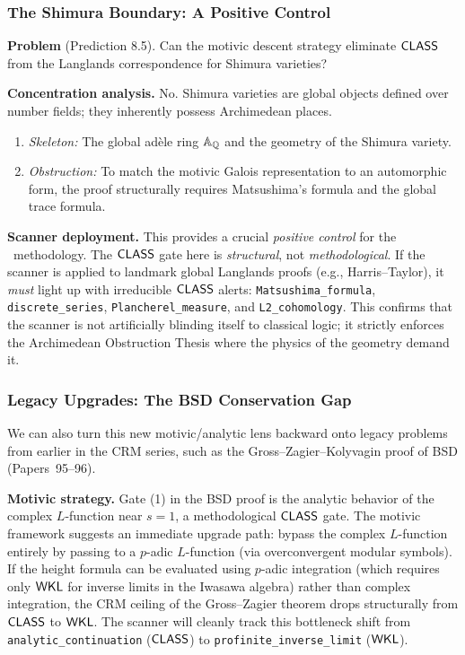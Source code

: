\subsubsection{The Shimura Boundary: A Positive Control}\label{sec:predict-shimura}

\noindent\textbf{Problem} (Prediction 8.5). Can the motivic descent strategy eliminate $\textsf{CLASS}$ from the Langlands correspondence for Shimura varieties?

\medskip
\noindent\textbf{Concentration analysis.} No. Shimura varieties are global objects defined over number fields; they inherently possess Archimedean places.

\begin{enumerate}[nosep,label=(\roman*)]
\item \emph{Skeleton:} The global ad\`ele ring $\mathbb{A}_{\mathbb{Q}}$ and the geometry of the Shimura variety.
\item \emph{Obstruction:} To match the motivic Galois representation to an automorphic form, the proof structurally requires Matsushima's formula and the global trace formula.
\end{enumerate}

\noindent\textbf{Scanner deployment.} This provides a crucial \emph{positive control} for the \CRMlint\ methodology. The $\textsf{CLASS}$ gate here is \emph{structural}, not \emph{methodological}. If the scanner is applied to landmark global Langlands proofs (e.g., Harris--Taylor), it \emph{must} light up with irreducible $\textsf{CLASS}$ alerts: \texttt{Matsushima\_formula}, \texttt{discrete\_series}, \texttt{Plancherel\_measure}, and \texttt{L2\_cohomology}. This confirms that the scanner is not artificially blinding itself to classical logic; it strictly enforces the Archimedean Obstruction Thesis where the physics of the geometry demand it.

\subsubsection{Legacy Upgrades: The BSD Conservation Gap}\label{sec:predict-bsd}

We can also turn this new motivic/analytic lens backward onto legacy problems from earlier in the CRM series, such as the Gross--Zagier--Kolyvagin proof of BSD (Papers~95--96).

\medskip
\noindent\textbf{Motivic strategy.} Gate (1) in the BSD proof is the analytic behavior of the complex $L$-function near $s=1$, a methodological $\textsf{CLASS}$ gate. The motivic framework suggests an immediate upgrade path: bypass the complex $L$-function entirely by passing to a $p$-adic $L$-function (via overconvergent modular symbols). If the height formula can be evaluated using $p$-adic integration (which requires only $\textsf{WKL}$ for inverse limits in the Iwasawa algebra) rather than complex integration, the CRM ceiling of the Gross--Zagier theorem drops structurally from $\textsf{CLASS}$ to $\textsf{WKL}$. The scanner will cleanly track this bottleneck shift from \texttt{analytic\_continuation} ($\textsf{CLASS}$) to \texttt{profinite\_inverse\_limit} ($\textsf{WKL}$).

